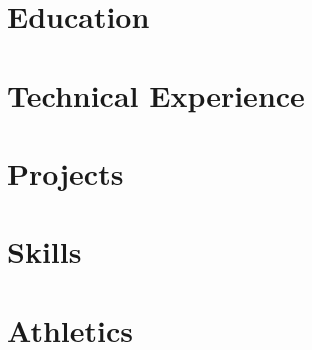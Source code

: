 \documentclass[letter,10pt]{article}
\begin{document}
\section{Education}


\section{Technical Experience}


\section{Projects}



\section{Skills}


\section{Athletics}

\end{document}
